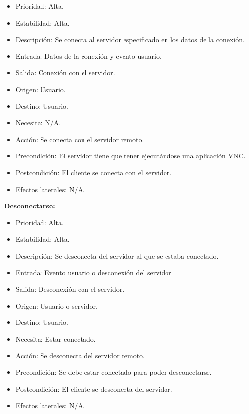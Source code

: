 \begin{itemize}
\item Prioridad: Alta.
\item Estabilidad: Alta.
\item Descripción: Se conecta al servidor especificado en los datos de la conexión.
\item Entrada: Datos de la conexión y evento usuario.
\item Salida: Conexión con el servidor.
\item Origen: Usuario.
\item Destino: Usuario.
\item Necesita: N/A.
\item Acción: Se conecta con el servidor remoto.
\item Precondición: El servidor tiene que tener ejecutándose una aplicación VNC.
\item Postcondición: El cliente se conecta con el servidor.
\item Efectos laterales: N/A.\\

\end{itemize}
\newpage
\textbf{Desconectarse:}
\begin{itemize}
\item Prioridad: Alta.
\item Estabilidad: Alta.
\item Descripción: Se desconecta del servidor al que se estaba conectado.
\item Entrada: Evento usuario o desconexión del servidor
\item Salida: Desconexión con el servidor.
\item Origen: Usuario o servidor.
\item Destino: Usuario.
\item Necesita: Estar conectado.
\item Acción: Se desconecta del servidor remoto.
\item Precondición: Se debe estar conectado para poder desconectarse.
\item Postcondición: El cliente se desconecta del servidor.
\item Efectos laterales: N/A.\\

\end{itemize}

